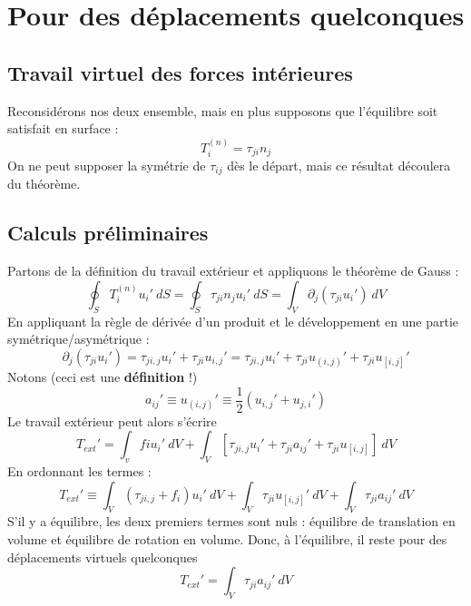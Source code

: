 \section{Pour des déplacements quelconques}
	\subsection{Travail virtuel des forces intérieures}
	Reconsidérons nos deux ensemble, mais en plus supposons que l'équilibre soit 
	satisfait en surface :
	\begin{equation}
	T_i^{(n)} = \tau_{ji}n_j
	\end{equation}
	\danger On ne peut supposer la symétrie de $\tau_{ij}$ dès le départ, mais 
	ce résultat découlera du théorème.
	
	\subsection{Calculs préliminaires}
	Partons de la définition du travail extérieur et appliquons le théorème de 
	Gauss :
	\begin{equation}
	\oint_S T_i^{(n)}u_i'\ dS = \oint_S \tau_{ji}n_ju_i'\ dS = \int_V \partial_j
	(\tau_{ji}u_i')\ dV
	\end{equation}
	En appliquant la règle de dérivée d'un produit et le développement en une 
	partie symétrique/asymétrique :
	\begin{equation}
	\partial_j(\tau_{ji}u_i') = \tau_{ji,j}u_i'+\tau_{ji}u_{i,j}' = \tau_{ji,j}
	u_i' + \tau_{ji}u_{(i,j)}'+\tau_{ji}u_{[i,j]}'
	\end{equation}
	Notons (ceci est une \textbf{définition} !)
	\begin{equation}
	a_{ij}' \equiv u_{(i,j)}' \equiv \dfrac{1}{2}(u_{i,j}'+u_{j,i}')
	\end{equation}
	Le travail extérieur peut alors s'écrire
	\begin{equation}
	T_{ext}' = \int_v fiu_i'\ dV + \int_V [\tau_{ji,j}u_i'+\tau_{ji}a_{ij}'+
	\tau_{ji}u_{[i,j]}]\ dV
	\end{equation}
	En ordonnant les termes :
	\begin{equation}
	T_{ext}' \equiv \int_V(\tau_{ji,j}+f_i)u_i'\ dV + \int_V\tau_{ji}u_{[i,j]}'\ 
	dV + \int_V\tau_{ji}a_{ij}'\ dV
	\end{equation}
	S'il y a équilibre, les deux premiers termes sont nuls : équilibre de 
	translation en volume et équilibre de rotation en volume. Donc, à 
	l'équilibre, il reste pour des déplacements virtuels quelconques 
	\begin{equation}
	T_{ext}' = \int_V \tau_{ji}a_{ij}'\ dV
	\end{equation}
